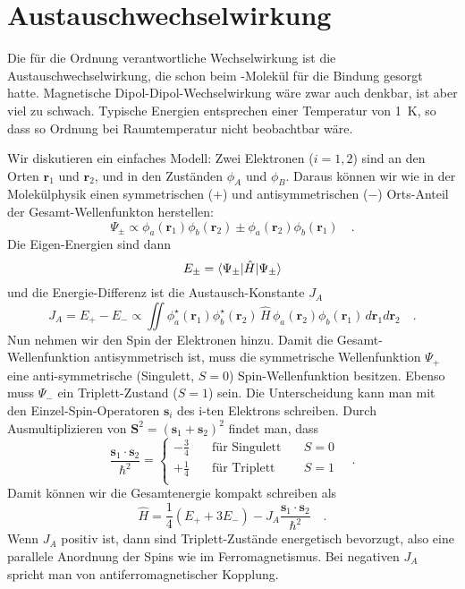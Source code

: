 \section*{Austauschwechselwirkung}

Die für die Ordnung verantwortliche Wechselwirkung ist die Austauschwechselwirkung, die schon beim -Molekül für die Bindung gesorgt hatte. Magnetische Dipol-Dipol-Wechselwirkung wäre zwar auch denkbar, ist aber viel zu schwach. Typische Energien entsprechen einer Temperatur von 1~K, so dass so Ordnung bei Raumtemperatur nicht beobachtbar wäre.

Wir diskutieren ein einfaches Modell: Zwei Elektronen ($i=1,2$) sind an den Orten $\bm{r}_1$ und $\bm{r}_2$, und in den Zuständen $\phi_A$ und $\phi_B$. Daraus können wir wie in der Molekülphysik einen symmetrischen ($+$) und antisymmetrischen ($-$)  Orts-Anteil der Gesamt-Wellenfunkton herstellen:
\begin{equation}
    \Psi_\pm  \propto \phi_a(\bm{r}_1) \phi_b(\bm{r}_2) \pm \phi_a(\bm{r}_2) \phi_b(\bm{r}_1)  \quad .
\end{equation}
Die Eigen-Energien sind dann 
\begin{equation}
    E_\pm = \braket{\Psi_\pm | \hat{H} | \Psi_\pm}
\end{equation}
und die Energie-Differenz ist die Austausch-Konstante $J_A$
\begin{equation}
    J_A = E_+ - E_-  \propto \iint \phi_a^\star(\bm{r}_1) \phi_b^\star(\bm{r}_2)  \,
    \hat{H} \, \phi_a(\bm{r}_2) \phi_b(\bm{r}_1) \, d\bm{r}_1   d\bm{r}_2   \quad .
\end{equation}
Nun nehmen wir den Spin der Elektronen hinzu. Damit die Gesamt-Wellenfunktion antisymmetrisch ist, muss die symmetrische Wellenfunktion $\Psi_+$  eine anti-symmetrische (Singulett, $S=0$) Spin-Wellenfunktion besitzen. Ebenso muss $\Psi_-$  ein Triplett-Zustand ($S=1$) sein. Die Unterscheidung kann man mit den Einzel-Spin-Operatoren   $\bm{s}_i$  des i-ten Elektrons schreiben. Durch Ausmultiplizieren von $\bm{S}^2 = (\bm{s}_1  + \bm{s}_2 )^2$ findet man, dass
\begin{equation}
    \frac{\bm{s}_1 \cdot \bm{s}_2}{\hbar^2}
    = \left\{ \begin{matrix}
        - \frac{3}{4} \quad & \text{für Singulett} \quad &S=0 \\
        + \frac{1}{4} \quad & \text{für Triplett} \quad & S=1 \\
    \end{matrix}
    \right.   \quad .
\end{equation} 
Damit können wir die Gesamtenergie kompakt schreiben als
\begin{equation}
    \hat{H} = \frac{1}{4} (E_+ + 3 E_-) - J_A \frac{\bm{s}_1 \cdot \bm{s}_2}{\hbar^2}  \quad .
    \label{eq:7_H_austausch_2e}
\end{equation}
Wenn $J_A$ positiv ist, dann sind Triplett-Zustände energetisch bevorzugt, also eine parallele Anordnung der Spins wie im Ferromagnetismus. Bei negativen $J_A$ spricht man von antiferromagnetischer Kopplung.

